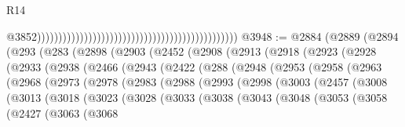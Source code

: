 \begin{lexlean}{R14}
\begin{coremodule}
                                                                                                  @3852)))))))))))))))))))))))))))))))))))))))))))))))
@3948 := @2884
    (@2889
      (@2894
        (@293
          (@283
            (@2898
              (@2903
                (@2452
                  (@2908
                    (@2913
                      (@2918
                        (@2923
                          (@2928
                            (@2933
                              (@2938
                                (@2466
                                  (@2943
                                    (@2422
                                      (@288
                                        (@2948
                                          (@2953
                                            (@2958
                                              (@2963
                                                (@2968
                                                  (@2973
                                                    (@2978
                                                      (@2983
                                                        (@2988
                                                          (@2993
                                                            (@2998
                                                              (@3003
                                                                (@2457
                                                                  (@3008
                                                                    (@3013
                                                                      (@3018
                                                                        (@3023
                                                                          (@3028
                                                                            (@3033
                                                                              (@3038
                                                                                (@3043
                                                                                  (@3048
                                                                                    (@3053
                                                                                      (@3058
                                                                                        (@2427
                                                                                          (@3063
                                                                                            (@3068

\end{coremodule}
\end{lexlean}
